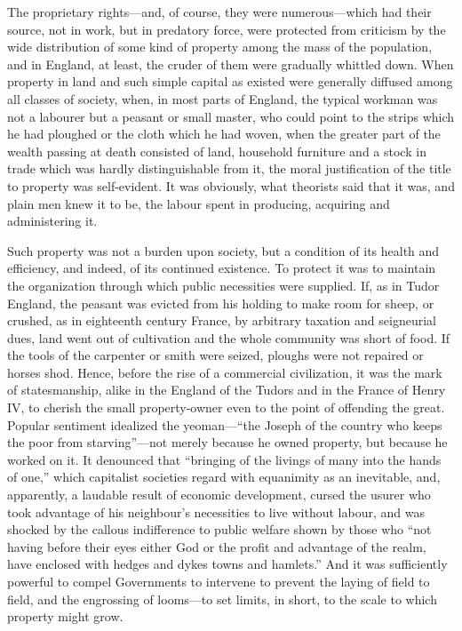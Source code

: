 \documentclass{book}
\begin{document}
The proprietary rights—and, of course, they were numerous—which had their source, not in work, but in predatory force, were protected from criticism by the wide distribution of some kind of property among the mass of the population, and in England, at least, the cruder of them were gradually whittled down. When property in land and such simple capital as existed were generally diffused among all classes of society, when, in most parts of England, the typical workman was not a labourer but a peasant or small master, who could point to the strips which he had ploughed or the cloth which he had woven, when the greater part of the wealth passing at death consisted of land, household furniture and a stock in trade which was hardly distinguishable from it, the moral justification of the title to property was self-evident. It was obviously, what theorists said that it was, and plain men knew it to be, the labour spent in producing, acquiring and administering it.

Such property was not a burden upon society, but a condition of its health and efficiency, and indeed, of its continued existence. To protect it was to maintain the organization through which public necessities were supplied. If, as in Tudor England, the peasant was evicted from his holding to make room for sheep, or crushed, as in eighteenth century France, by arbitrary taxation and seigneurial dues, land went out of cultivation and the whole community was short of food. If the tools of the carpenter or smith were seized, ploughs were not repaired or horses shod. Hence, before the rise of a commercial civilization, it was the mark of statesmanship, alike in the England of the Tudors and in the France of Henry IV, to cherish the small property-owner even to the point of offending the great. Popular sentiment idealized the yeoman—“the Joseph of the country who keeps the poor from starving”—not merely because he owned property, but because he worked on it. It denounced that “bringing of the livings of many into the hands of one,” which capitalist societies regard with equanimity as an inevitable, and, apparently, a laudable result of economic development, cursed the usurer who took advantage of his neighbour’s necessities to live without labour, and was shocked by the callous indifference to public welfare shown by those who “not having before their eyes either God or the profit and advantage of the realm, have enclosed with hedges and dykes towns and hamlets.” And it was sufficiently powerful to compel Governments to intervene to prevent the laying of field to field, and the engrossing of looms—to set limits, in short, to the scale to which property might grow.
\end{document}
